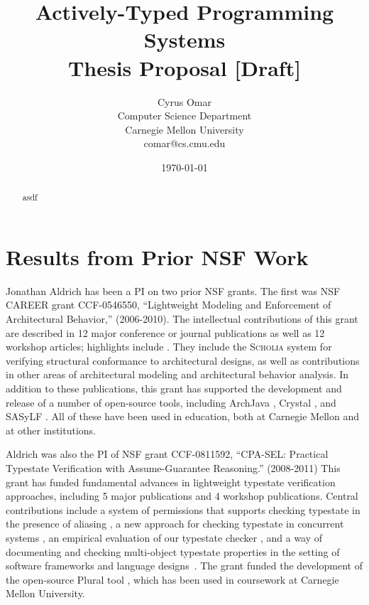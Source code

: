 \documentclass[10pt]{article}
\title{Actively-Typed Programming Systems\\\large{{Thesis Proposal [Draft]}}}
\author{Cyrus Omar\\
Computer Science Department\\
Carnegie Mellon University\\
comar@cs.cmu.edu}
\date{\today}                                           %
\begin{document}
\maketitle

\begin{abstract}
asdf
\end{abstract}


\sloppy

\begin{center}



\normalsize
\end{center}









\section{Results from Prior NSF Work}

Jonathan Aldrich has been a PI on two prior NSF grants.  The first was
NSF CAREER grant CCF-0546550, ``Lightweight Modeling and Enforcement
of Architectural Behavior,'' (2006-2010).  The intellectual
contributions of this grant are described in 12 major conference or
journal publications as well as 12 workshop articles; highlights
include \cite{AAC07,AAN+08,AA07a,AA07b,AA08d,AA09a,AA09b,AB10}. They
include the \textsc{Scholia} system for verifying structural
conformance to architectural designs, as well as contributions in
other areas of architectural modeling and architectural behavior
analysis. In addition to these publications, this grant has supported
the development and release of a number of open-source tools,
including ArchJava \cite{ArchJava}, Crystal \cite{Crystal}, and SASyLF
\cite{SASyLF}. All of these have been used in education, both at
Carnegie Mellon and at other institutions.

Aldrich was also the PI of NSF grant CCF-0811592, ``CPA-SEL: Practical
Typestate Verification with Assume-Guarantee Reasoning.'' (2008-2011)
This grant has funded fundamental advances in lightweight typestate
verification approaches, including 5 major publications and 4 workshop
publications.  Central contributions include a system of permissions
that supports checking typestate in the presence of aliasing
\cite{bierhoff09:thesis}, a new approach for checking typestate in
concurrent systems \cite{beckman08:verifying_atomic}, an empirical
evaluation of our typestate checker \cite{bierhoff09:plural}, and a
way of documenting and checking multi-object typestate properties in
the setting of software frameworks \cite{JA09} and language designs~\cite{aldrich11:plaid,sunshine11:plaid}. The grant funded the
development of the open-source Plural tool \cite{pluraltool}, which
has been used in coursework at Carnegie Mellon University.
\end{document}
